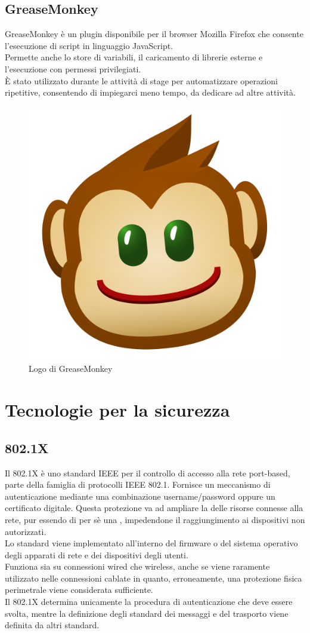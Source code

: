 \documentclass[Tesi.tex]{subfiles}
\begin{document}
\subsection{GreaseMonkey}
GreaseMonkey è un plugin disponibile per il browser Mozilla Firefox che consente l'esecuzione di script in linguaggio JavaScript. \\
Permette anche lo store di variabili, il caricamento di librerie esterne e l'esecuzione con permessi privilegiati. \\
\`{E} stato utilizzato durante le attività di stage per automatizzare operazioni ripetitive, consentendo di impiegarci meno tempo, da dedicare ad altre attività.
\begin{figure}[H]
	\centering
	\includegraphics[width=0.35\linewidth]{"images/logo/GreaseMonkey_logo"}
	\caption{Logo di GreaseMonkey}
	\label{fig:Logo di GreaseMonkey}
\end{figure}

\newpage
\section{Tecnologie per la sicurezza}
\subsection{802.1X}
Il 802.1X è uno standard IEEE per il controllo di accesso alla rete port-based, parte della famiglia di protocolli IEEE 802.1. Fornisce un meccanismo di autenticazione mediante una combinazione username/password oppure un certificato digitale.
Questa protezione va ad ampliare la  delle risorse connesse alla rete, pur essendo di per sè una , impedendone il raggiungimento ai dispositivi non autorizzati. \\
Lo standard viene implementato all'interno del firmware o del sistema operativo degli apparati di rete e dei dispositivi degli utenti.\\
Funziona sia su connessioni wired che wireless, anche se viene raramente utilizzato nelle connessioni cablate in quanto, erroneamente, una protezione fisica perimetrale viene considerata sufficiente. \\
Il 802.1X determina unicamente la procedura di autenticazione che deve essere svolta, mentre la definizione degli standard dei messaggi e del trasporto viene definita da altri standard.
\end{document}

